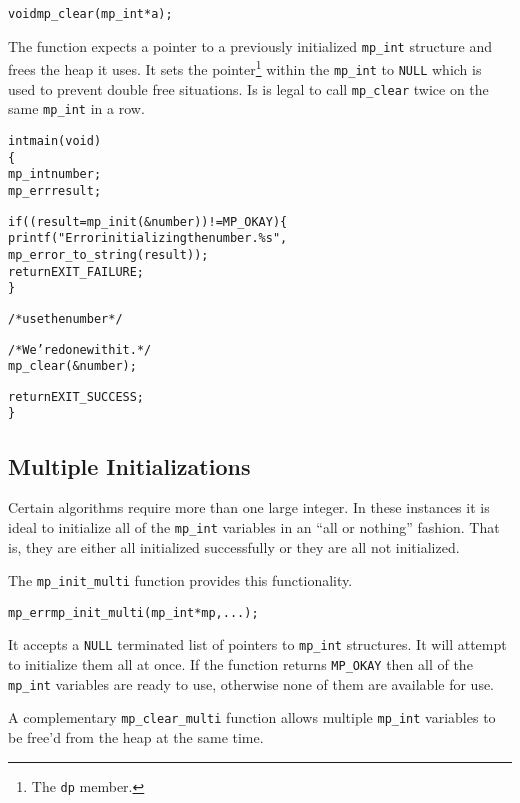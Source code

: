 \documentclass[synpaper]{book}
\begin{document}
\begin{alltt}
void mp_clear (mp_int *a);
\end{alltt}

The function expects a pointer to a previously initialized \texttt{mp\_int} structure and frees the
heap it uses.  It sets the pointer\footnote{The \texttt{dp} member.} within the \texttt{mp\_int} to
\texttt{NULL} which is used to prevent double free situations. Is is legal to call
\texttt{mp\_clear} twice on the same \texttt{mp\_int} in a row.

\begin{small}
  \begin{alltt}
int main(void)
\{
   mp_int number;
   mp_err result;

   if ((result = mp_init(&number)) != MP_OKAY) \{
      printf("Error initializing the number.  \%s",
             mp_error_to_string(result));
      return EXIT_FAILURE;
   \}

   /* use the number */

   /* We're done with it. */
   mp_clear(&number);

   return EXIT_SUCCESS;
\}
  \end{alltt}
\end{small}

\subsection{Multiple Initializations}
Certain algorithms require more than one large integer.  In these instances it is ideal to
initialize all of the \texttt{mp\_int} variables in an ``all or nothing'' fashion.  That is, they
are either all initialized successfully or they are all not initialized.

The  \texttt{mp\_init\_multi} function provides this functionality.

 
\begin{alltt}
mp_err mp_init_multi(mp_int *mp, ...);
\end{alltt}

It accepts a \texttt{NULL} terminated list of pointers to \texttt{mp\_int} structures.  It will
attempt to initialize them all at once.  If the function returns \texttt{MP\_OKAY} then all of the
\texttt{mp\_int} variables are ready to use, otherwise none of them are available for use.

A complementary \texttt{mp\_clear\_multi} function allows multiple \texttt{mp\_int} variables to be
free'd
from the heap at the same time.
\end{document}
